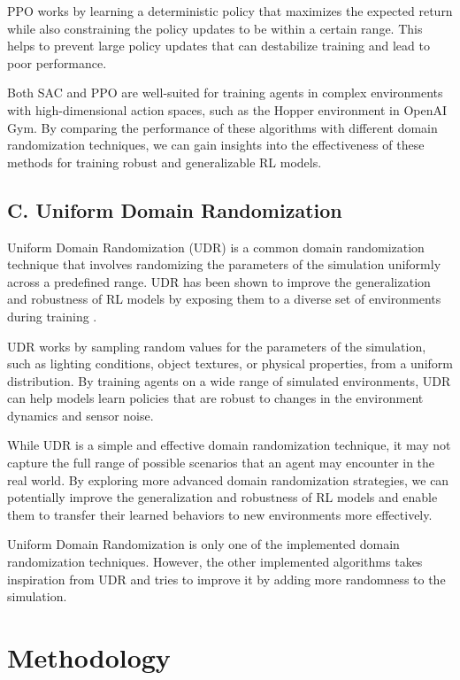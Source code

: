 \documentclass[11pt]{article}
\begin{document}
PPO works by learning a deterministic policy that maximizes the expected return while also constraining the policy updates to be within a certain range. This helps to prevent large policy updates that can destabilize training and lead to poor performance.

Both SAC and PPO are well-suited for training agents in complex environments with high-dimensional action spaces, such as the Hopper environment in OpenAI Gym. By comparing the performance of these algorithms with different domain randomization techniques, we can gain insights into the effectiveness of these methods for training robust and generalizable RL models.

\subsection{C. Uniform Domain Randomization}

Uniform Domain Randomization (UDR) is a common domain randomization technique that involves randomizing the parameters of the simulation uniformly across a predefined range. UDR has been shown to improve the generalization and robustness of RL models by exposing them to a diverse set of environments during training \cite{Tobin2017}.

UDR works by sampling random values for the parameters of the simulation, such as lighting conditions, object textures, or physical properties, from a uniform distribution. By training agents on a wide range of simulated environments, UDR can help models learn policies that are robust to changes in the environment dynamics and sensor noise.

While UDR is a simple and effective domain randomization technique, it may not capture the full range of possible scenarios that an agent may encounter in the real world. By exploring more advanced domain randomization strategies, we can potentially improve the generalization and robustness of RL models and enable them to transfer their learned behaviors to new environments more effectively. 

Uniform Domain Randomization is only one of the implemented domain randomization techniques. However, the other implemented algorithms takes inspiration from UDR and tries to improve it by adding more randomness to the simulation.

\section{Methodology}
\end{document}
